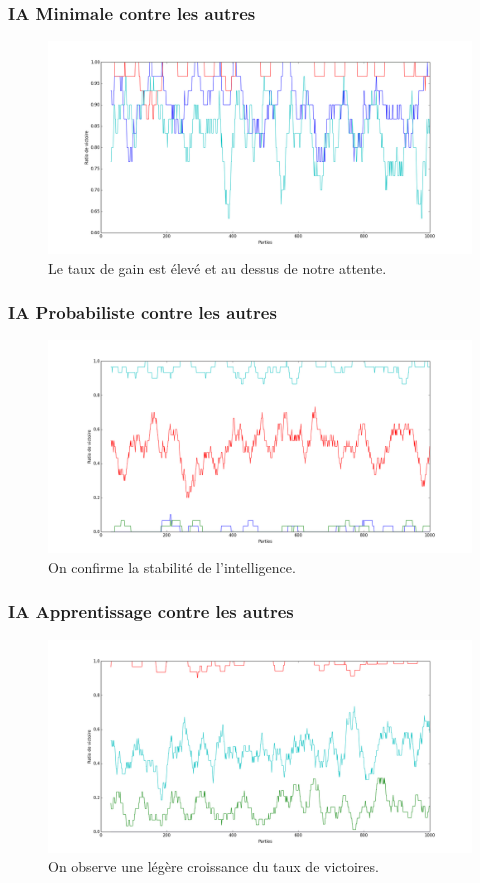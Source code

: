 \documentclass{beamer}
\begin{document}
\begin{frame}
  \frametitle{IA Minimale contre les autres}
  \begin{figure}
    \includegraphics[scale=0.265]{plot/debile}
    \caption{
      \label{fig_debile} Le taux de gain est élevé et au dessus de notre attente.
    }
  \end{figure}
\end{frame}

\begin{frame}
  \frametitle{IA Probabiliste contre les autres}
  \begin{figure}
    \includegraphics[scale=0.265]{plot/stats}
    \caption{
      \label{fig_stats} On confirme la stabilité de l'intelligence.
    }
  \end{figure}
\end{frame}

\begin{frame}
  \frametitle{IA Apprentissage contre les autres}
  \begin{figure}
    \includegraphics[scale=0.265]{plot/eleve}
    \caption{
      \label{fig_eleve} On observe une légère croissance du taux de victoires.
    }
  \end{figure}
\end{frame}
\end{document}
